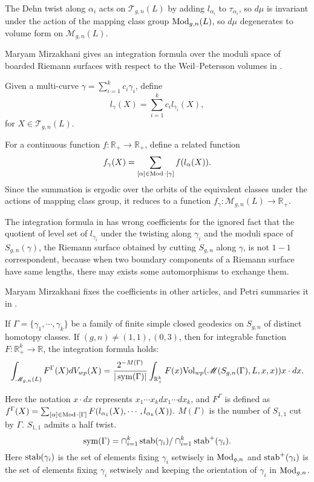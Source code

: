 The Dehn twist along $\alpha_i$ acts on $\mathscr{T}_{g,n}(L)$ by  adding  $l_{\alpha_i}$ to $\tau_{\alpha_i}$, so $d\mu$ is invariant under the action of  the mapping class group $\operatorname{Mod}_{g,n}(L)$, so $d\mu$ degenerates to volume form on $\mathscr{M}_{g,n}(L)$.

Maryam Mirzakhani gives an integration formula over the moduli space of boarded Riemann surfaces with respect to the Weil--Petersson volumes in \cite{Mirzakhani:2006fta}.

Given a multi-curve $\gamma=\sum_{i=1}^k c_i\gamma_i$, define $$l_\gamma(X)=\sum_{i=1}^kc_il_{\gamma_i}(X),$$
for $X\in \mathscr{T}_{g,n}(L)$.

For a continuous function $f\colon\mathbb{R}_+\to \mathbb{R}_+$, define a related function $$
f_\gamma(X)=\sum_{[\alpha]\in \operatorname{Mod}\cdot[\gamma]}f(l_\alpha(X)).
$$
 Since the summation is ergodic over the orbits of the  equivalent classes under the actions of mapping class group, it  reduces to a function $f_\gamma\colon\mathscr{M}_{g,n}(L)\to \mathbb{R}_+$.
 
 The integration formula in  \cite{Mirzakhani:2006fta} has wrong coefficients for the ignored  fact that  the quotient  of  level set of $l_{\gamma_i}$ under the twisting along $\gamma_i$ and the moduli space of $S_{g,n}(\gamma)$, the Riemann surface obtained by cutting $S_{g,n}$ along $\gamma$, is not $1-1$ correspondent,  because when two boundary components of a Riemann surface  have same lengths, there may exists some automorphisms to exchange them. 
 
 Maryam Mirzakhani fixes the coefficients in other articles, and Petri summaries it in \cite{Teithe}.
 
 \begin{thma}
 If $\Gamma=\{\gamma_1,\cdots,\gamma_k\}$ be a family of finite simple closed geodesics on $S_{g,n}$ of distinct homotopy classes. If $(g,n)\neq (1,1),(0,3)$, then  for integrable function $F:\mathbb{R}_+^k\to \mathbb{R}$, the integration formula holds:
 $$
 \int_{\mathscr{M}_{g,n}(L)}F^\Gamma(X)dV_{wp}(X)=\frac{2^{-M(\Gamma)}}{|\operatorname{sym}(\Gamma)|}\int_{\mathbb{R}_+^k}F(x)\mathrm{Vol}_{wp}(\mathscr{M}(S_{g,n}(\Gamma),L,x,x))x\cdot dx.
 $$
 
 Here  the notation $x\cdot dx$ represents $x_1\cdots x_k dx_1\cdots dx_k$, and $F^\Gamma$ is defined as $f^{\Gamma}(X)=\sum_{[\alpha]\in \operatorname{Mod}\cdot [\Gamma]}F(l_{\alpha_1}(X),\cdots,l_{\alpha_k}(X))$. $M(\Gamma)$  is the number of $S_{1,1}$ cut by $\Gamma$. $S_{1,1}$ admits a half twist.
 $$\operatorname{sym}(\Gamma)=\cap_{i=1}^k\operatorname{stab}(\gamma_i)/\cap_{i=1}^k\operatorname{stab}^+(\gamma_i).$$
 Here $\operatorname{stab}(\gamma_i)$ is the set of  elements fixing $\gamma_i$  setwisely in $\operatorname{Mod}_{g,n}$  and $\operatorname{stab}^+(\gamma_i)$ is the set of  elements fixing $\gamma_i$ setwisely and keeping the orientation of $\gamma_i$  in $\operatorname{Mod}_{g,n}$. 
 \end{thma}
 
